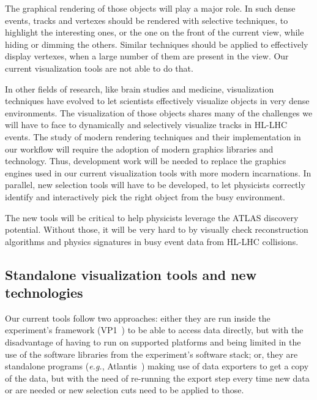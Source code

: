 The graphical rendering of those objects will play a major role. In such dense events, tracks and vertexes should be rendered with selective techniques, to highlight the interesting ones, or the one on the front of the current view, while hiding or dimming the others. Similar techniques should be applied to effectively display vertexes, when a large number of them are present in the view. Our current visualization tools are not able to do that. 

In other fields of research, like brain studies and medicine, visualization techniques have evolved to let scientists effectively visualize objects in very dense environments. The visualization of those objects shares many of the challenges we will have to face to dynamically and selectively visualize tracks in HL-LHC events. 
The study of modern rendering techniques and their implementation in our workflow will require the adoption of modern graphics libraries and technology. Thus, development work will be needed to replace the graphics engines used in our current visualization tools with more modern incarnations.
In parallel, new selection tools will have to be developed, to let physicists correctly identify and interactively pick the right object from the busy environment.

The new tools will be critical to help physicists leverage the ATLAS discovery potential. Without those, it will be very hard to by visually check reconstruction algorithms and physics signatures in busy event data from HL-LHC collisions.



\subsection{Standalone visualization tools and new technologies}


Our current tools follow two approaches: either they are run inside the experiment's framework (VP1~\cite{ref:vp1-web}) to be able to access data directly, but with the disadvantage of having to run on supported platforms and being limited in the use of the software libraries from the experiment's software stack; or, they are standalone programs (\textit{e.g.}, Atlantis~\cite{ref:atlantis-web}) making use of data exporters to get a copy of the data, but with the need of re-running the export step every time new data or are needed or new selection cuts need to be applied to those.

